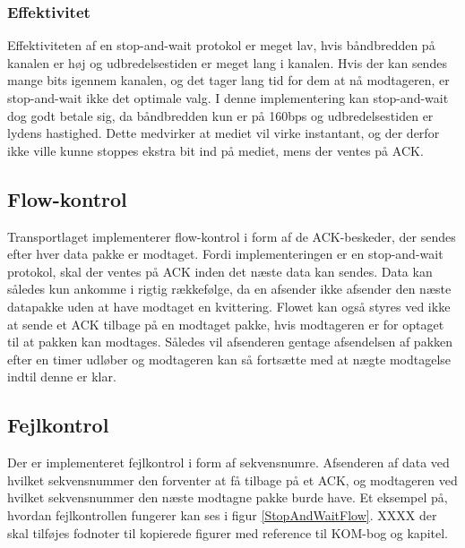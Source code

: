\subsubsection{Effektivitet}
Effektiviteten af en stop-and-wait protokol er meget lav, hvis båndbredden på kanalen er høj og udbredelsestiden er meget lang i kanalen. Hvis der kan sendes mange bits igennem kanalen, og det tager lang tid for dem at nå modtageren, er stop-and-wait ikke det optimale valg. I denne implementering kan stop-and-wait dog godt betale sig, da båndbredden kun er på 160bps og udbredelsestiden er lydens hastighed. Dette medvirker at mediet vil virke instantant, og der derfor ikke ville kunne stoppes ekstra bit ind på mediet, mens der ventes på ACK.

\subsection{Flow-kontrol}
Transportlaget implementerer flow-kontrol i form af de ACK-beskeder, der sendes efter hver data pakke er modtaget. Fordi implementeringen er en stop-and-wait protokol, skal der ventes på ACK inden det næste data kan sendes. Data kan således kun ankomme i rigtig rækkefølge, da en afsender ikke afsender den næste datapakke uden at have modtaget en kvittering. Flowet kan også styres ved ikke at sende et ACK tilbage på en modtaget pakke, hvis modtageren er for optaget til at pakken kan modtages. Således vil afsenderen gentage afsendelsen af pakken efter en timer udløber og modtageren kan så fortsætte med at nægte modtagelse indtil denne er klar.

\subsection{Fejlkontrol}
Der er implementeret fejlkontrol i form af sekvensnumre. Afsenderen af data ved hvilket sekvensnummer den forventer at få tilbage på et ACK, og modtageren ved hvilket sekvensnummer den næste modtagne pakke burde have. Et eksempel på, hvordan fejlkontrollen fungerer kan ses i figur \ref{StopAndWaitFlow}.
XXXX der skal tilføjes fodnoter til kopierede figurer med reference til KOM-bog og kapitel.

